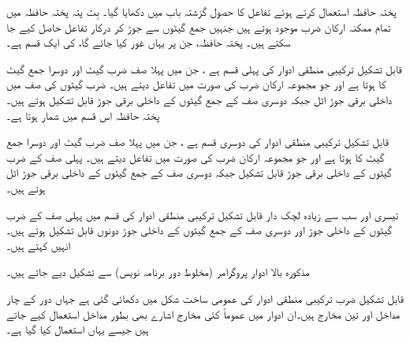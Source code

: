 پختہ حافظہ استعمال کرتے ہوئے تفاعل کا حصول گزشتہ باب میں دکھایا گیا۔  بِٹ پتہ پختہ حافظہ میں تمام ممکنہ  ارکان ضرب موجود ہوتے ہیں جنہیں جمع گیٹوں سے جوڑ کر درکار تفاعل حاصل کیے جا سکتے ہیں۔ پختہ حافظہ، جن پر یہاں غور کیا جائے گا، کی ایک قسم ہے۔

قابل تشکیل ترکیبی منطقی ادوار کی پہلی قسم   ہے ، جن میں پہلا صف ضرب گیٹ اور دوسرا جمع گیٹ کا ہوتا ہے اور جو مجموعہ ارکان ضرب کی صورت میں تفاعل دیتے ہیں۔ ضرب گیٹوں کی صف میں داخلی برقی جوڑ اٹل جبکہ دوسری صف کے جمع گیٹوں کے داخلی برقی جوڑ قابل تشکیل ہوتے ہیں۔پختہ حافظہ اس قسم میں شمار ہوتا ہے۔

قابل تشکیل ترکیبی منطقی ادوار کی دوسری قسم   ہے ، جن میں پہلا صف ضرب گیٹ اور دوسرا جمع گیٹ کا ہوتا ہے اور جو مجموعہ ارکان ضرب کی صورت میں تفاعل دیتے ہیں۔ پہلی صف کے ضرب گیٹوں کے داخلی برقی جوڑ قابل تشکیل جبکہ دوسری صف کے جمع گیٹوں کے داخلی برقی جوڑ اٹل ہوتے ہیں۔

تیسری اور سب سے زیادہ لچک دار قابل تشکیل ترکیبی منطقی ادوار کی قسم میں پہلی صف کے ضرب گیٹوں کے داخلی جوڑ اور دوسری صف کے جمع گیٹوں کے داخلی جوڑ دونوں قابل تشکیل ہوتے ہیں۔انہیں کہتے ہیں۔

مذکورہ بالا ادوار پروگرامر (مخلوط دور برنامہ نویس) سے تشکیل دیے جاتے ہیں۔


قابل تشکیل ضرب ترکیبی منطقی ادوار کی عمومی ساخت شکل    میں دکھائی گئی ہے جہاں دور کے چار مداخل اور تین مخارج ہیں۔ان ادوار میں عموماً کئی مخارج اشارے بھی بطور مداخل استعمال کیے جاتے ہیں جیسے یہاں  استعمال کیا گیا ہے۔


